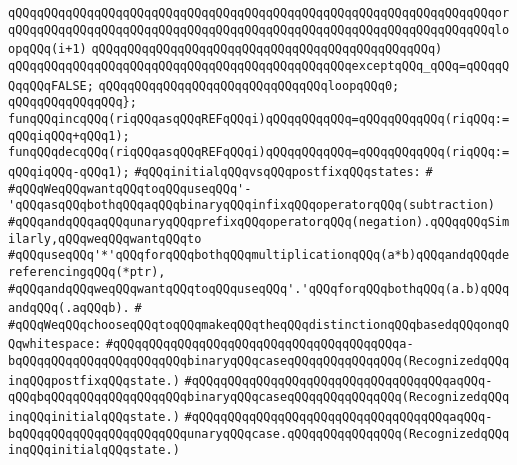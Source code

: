 \verb|qQQqqQQqqQQqqQQqqQQqqQQqqQQqqQQqqQQqqQQqqQQqqQQqqQQqqQQqqQQqqQQqqQQqor|\newline
\verb|qQQqqQQqqQQqqQQqqQQqqQQqqQQqqQQqqQQqqQQqqQQqqQQqqQQqqQQqqQQqqQQqqQQqloopqQQq(i+1)|\newline
\verb|qQQqqQQqqQQqqQQqqQQqqQQqqQQqqQQqqQQqqQQqqQQqqQQq)|\newline
\verb|qQQqqQQqqQQqqQQqqQQqqQQqqQQqqQQqqQQqqQQqqQQqqQQqexceptqQQq_qQQq=qQQqqQQqqQQqFALSE;|\newline
\newline
\verb|qQQqqQQqqQQqqQQqqQQqqQQqqQQqqQQqloopqQQq0;|\newline
\verb|qQQqqQQqqQQqqQQq};|\newline
\newline
\verb|funqQQqincqQQq(riqQQqasqQQqREFqQQqi)qQQqqQQqqQQq=qQQqqQQqqQQq(riqQQq:=qQQqiqQQq+qQQq1);|\newline
\verb|funqQQqdecqQQq(riqQQqasqQQqREFqQQqi)qQQqqQQqqQQq=qQQqqQQqqQQq(riqQQq:=qQQqiqQQq-qQQq1);|\newline
\newline
\newline
\verb|#qQQqinitialqQQqvsqQQqpostfixqQQqstates:|\newline
\verb|#|\newline
\verb|#qQQqWeqQQqwantqQQqtoqQQquseqQQq'-'qQQqasqQQqbothqQQqaqQQqbinaryqQQqinfixqQQqoperatorqQQq(subtraction)|\newline
\verb|#qQQqandqQQqaqQQqunaryqQQqprefixqQQqoperatorqQQq(negation).qQQqqQQqSimilarly,qQQqweqQQqwantqQQqto|\newline
\verb|#qQQquseqQQq'*'qQQqforqQQqbothqQQqmultiplicationqQQq(a*b)qQQqandqQQqdereferencingqQQq(*ptr),|\newline
\verb|#qQQqandqQQqweqQQqwantqQQqtoqQQquseqQQq'.'qQQqforqQQqbothqQQq(a.b)qQQqandqQQq(.aqQQqb).|\newline
\verb|#|\newline
\verb|#qQQqWeqQQqchooseqQQqtoqQQqmakeqQQqtheqQQqdistinctionqQQqbasedqQQqonqQQqwhitespace:|\newline
\verb|#qQQqqQQqqQQqqQQqqQQqqQQqqQQqqQQqqQQqqQQqa-bqQQqqQQqqQQqqQQqqQQqqQQqbinaryqQQqcaseqQQqqQQqqQQqqQQq(RecognizedqQQqinqQQqpostfixqQQqstate.)|\newline
\verb|#qQQqqQQqqQQqqQQqqQQqqQQqqQQqqQQqqQQqaqQQq-qQQqbqQQqqQQqqQQqqQQqqQQqbinaryqQQqcaseqQQqqQQqqQQqqQQq(RecognizedqQQqinqQQqinitialqQQqstate.)|\newline
\verb|#qQQqqQQqqQQqqQQqqQQqqQQqqQQqqQQqqQQqaqQQq-bqQQqqQQqqQQqqQQqqQQqqQQqunaryqQQqcase.qQQqqQQqqQQqqQQq(RecognizedqQQqinqQQqinitialqQQqstate.)|\newline
